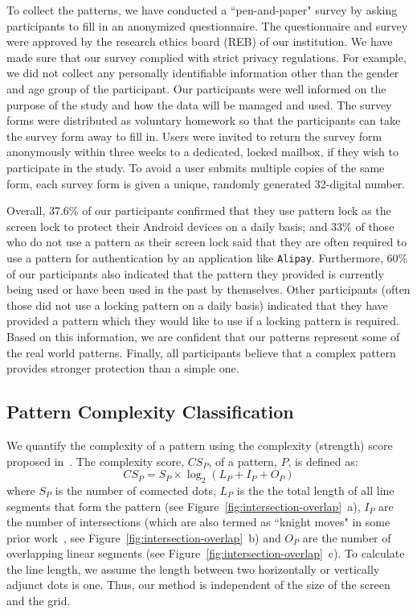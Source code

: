     To collect the patterns, we have conducted a ``pen-and-paper" survey by asking participants to fill in an anonymized questionnaire.
    The questionnaire and survey were approved by the research ethics board (REB) of our institution.
    We have made sure that our survey complied with strict privacy regulations. For example, we did not collect any personally identifiable information other than the gender and age group of the participant. Our participants were well informed on the purpose
    of the study and how the data will be managed and used. The survey forms were distributed as voluntary homework so that the participants can take the survey form away to fill in.
     Users were invited to return the survey form anonymously within three weeks to a dedicated, locked mailbox, if they wish to participate in the study.
     To avoid a user submits multiple copies of the same form, each survey form is given a unique, randomly generated 32-digital number.


     Overall, 37.6\% of our participants confirmed that they use pattern lock as the screen lock to
     protect their Android devices on a daily basis; and 33\% of those  who do not use a pattern as their screen lock said that they
     are often required to use a pattern for authentication by an application like \texttt{Alipay}. Furthermore, 60\%
     of our participants also indicated that the pattern they provided is currently being used
     or have been used in the past by themselves. Other participants (often those did not use a locking pattern on a daily basis) indicated that they
     have provided a pattern which they would like to use if a locking
     pattern is required. Based on this information, we are confident
     that our patterns represent some of the real world
     patterns. Finally, all participants believe that a complex pattern provides stronger protection than a simple one.


    \subsection{Pattern Complexity Classification}
    We quantify the complexity of a pattern using the complexity (strength) score proposed in~\cite{sun2014dissecting}.
        The complexity score, $CS_{P}$, of a pattern, $P$, is defined as:
    \begin{equation}
      CS_{P}=S_{P}\times\log_{2}(L_{P}+I_{P}+O_{P})
    \label{equ:compscore}
    \end{equation}
    where $S_{P}$ is the number of connected dots, $L_{P}$ is the the total length of all line segments that form the pattern (see Figure~\ref{fig:intersection-overlap}~a), $I_{P}$ are the number of intersections (which are also termed as ``knight moves" in some prior work~\cite{vonZezschwitz:2015:EDB:2702123.2702202}, see Figure~\ref{fig:intersection-overlap}~b) and $O_{P}$ are the number of overlapping linear segments (see Figure~\ref{fig:intersection-overlap}~c).  To calculate the line length, we assume the length between two horizontally or vertically adjunct dots is one. Thus, our method is independent of the size of the screen and the grid.


